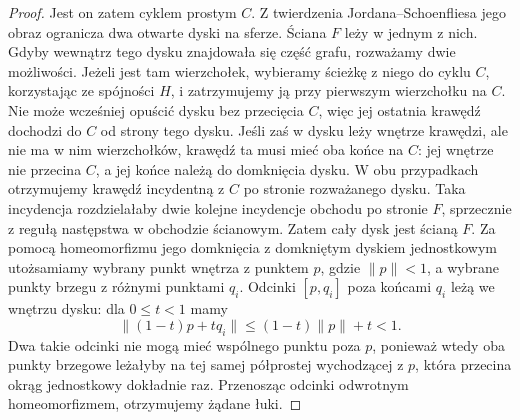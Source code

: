 \begin{proof}
Jest on zatem cyklem prostym $C$.
Z twierdzenia Jordana--Schoenfliesa jego obraz
ogranicza dwa otwarte dyski na sferze.
Ściana $F$ leży w jednym z nich. Gdyby wewnątrz
tego dysku znajdowała się część grafu, rozważamy
dwie możliwości. Jeżeli jest tam wierzchołek,
wybieramy ścieżkę z niego do cyklu $C$, korzystając
ze spójności $H$, i zatrzymujemy ją przy pierwszym
wierzchołku na $C$. Nie może wcześniej opuścić
dysku bez przecięcia $C$, więc jej ostatnia
krawędź dochodzi do $C$ od strony tego dysku.
Jeśli zaś w dysku leży wnętrze krawędzi, ale
nie ma w nim wierzchołków, krawędź ta musi
mieć oba końce na $C$: jej wnętrze nie przecina
$C$, a jej końce należą do domknięcia dysku.
W obu przypadkach otrzymujemy krawędź
incydentną z $C$ po stronie rozważanego dysku.
Taka incydencja rozdzielałaby dwie kolejne
incydencje obchodu po stronie $F$, sprzecznie
z regułą następstwa w obchodzie ścianowym.
Zatem cały dysk jest ścianą $F$.
Za pomocą homeomorfizmu jego domknięcia
z domkniętym dyskiem jednostkowym utożsamiamy wybrany
punkt wnętrza z punktem $p$, gdzie $\|p\|<1$,
a wybrane punkty brzegu z różnymi punktami $q_i$.
Odcinki $[p,q_i]$ poza końcami $q_i$ leżą we wnętrzu
dysku: dla $0\le t<1$ mamy
\[
\|(1-t)p+tq_i\|\le (1-t)\|p\|+t<1.
\]
Dwa takie odcinki nie mogą mieć wspólnego punktu
poza $p$, ponieważ wtedy oba punkty brzegowe
leżałyby na tej samej półprostej wychodzącej z $p$,
która przecina okrąg jednostkowy dokładnie raz.
Przenosząc odcinki odwrotnym homeomorfizmem,
otrzymujemy żądane łuki.
\end{proof}



